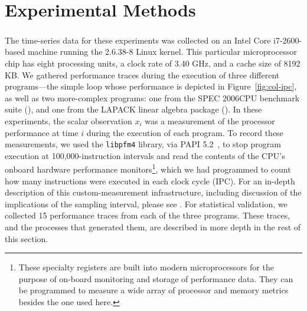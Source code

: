 \section{Experimental Methods}\label{sec:methods}



The time-series data for these experiments was collected on an Intel
Core\textsuperscript{\textregistered} i7-2600-based machine running
the 2.6.38-8 Linux kernel.  This particular microprocessor chip has
eight processing units, a clock rate of 3.40 GHz, and a cache size of
8192 KB.  We gathered performance traces during the execution of three
different programs---the simple \col loop whose performance is
depicted in Figure~\ref{fig:col-ipc}, as well as two more-complex
programs: one from the SPEC 2006CPU benchmark suite (\gcc), and one
from the LAPACK linear algebra package (\svd).  In these experiments, the scalar observation $x_i$ was a measurement of the processor performance at time $i$ during the execution of each program.  To record these measurements, we used the {\tt libpfm4}
library, via PAPI
% 
% 
5.2~\cite{papi}, to stop program execution at 100,000-instruction
intervals and read the contents of the CPU's onboard hardware
performance monitors\footnote{These specialty registers are built into
  modern microprocessors for the purpose of on-board monitoring and
  storage of performance data.  They can be programmed to measure a
  wide array of processor and memory metrics besides the one used
  here.}, which we had programmed to count how many instructions were
executed in each clock cycle (IPC).  For an in-depth description of
this custom-measurement infrastructure, including discussion of the
implications of the sampling interval, please see
\cite{zach-IDA10,mytkowicz09,todd-phd}.  For statistical validation,
we collected 15 performance traces from each of the three programs.
These traces, and the processes that generated them, are described in
more depth in the rest of this section.


